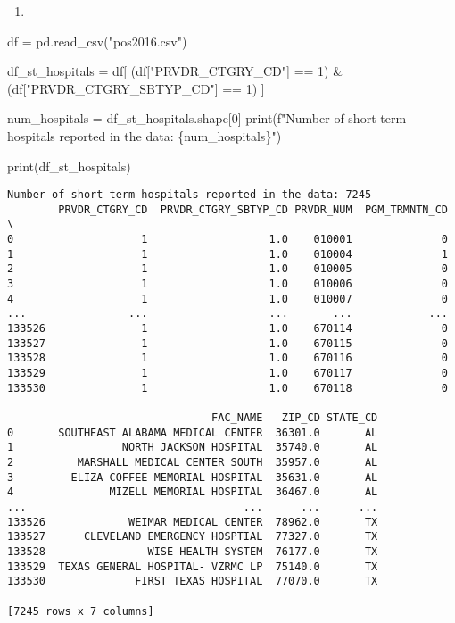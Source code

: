 \documentclass[
  letterpaper,
  DIV=11,
  numbers=noendperiod]{scrartcl}
\newenvironment{Shaded}{\begin{snugshade}}{\end{snugshade}}
\newcommand{\BuiltInTok}[1]{\textcolor[rgb]{0.00,0.23,0.31}{#1}}
\newcommand{\DecValTok}[1]{\textcolor[rgb]{0.68,0.00,0.00}{#1}}
\newcommand{\NormalTok}[1]{\textcolor[rgb]{0.00,0.23,0.31}{#1}}
\newcommand{\OperatorTok}[1]{\textcolor[rgb]{0.37,0.37,0.37}{#1}}
\newcommand{\SpecialCharTok}[1]{\textcolor[rgb]{0.37,0.37,0.37}{#1}}
\newcommand{\SpecialStringTok}[1]{\textcolor[rgb]{0.13,0.47,0.30}{#1}}
\newcommand{\StringTok}[1]{\textcolor[rgb]{0.13,0.47,0.30}{#1}}
\providecommand{\tightlist}{%
  \setlength{\itemsep}{0pt}\setlength{\parskip}{0pt}}\usepackage{longtable,booktabs,array}
\begin{document}
\begin{enumerate}
\def\labelenumi{\arabic{enumi}.}
\setcounter{enumi}{1}
\tightlist
\item
\end{enumerate}

\begin{Shaded}
\begin{Highlighting}[]
\NormalTok{df }\OperatorTok{=}\NormalTok{ pd.read\_csv(}\StringTok{"pos2016.csv"}\NormalTok{)}


\NormalTok{df\_st\_hospitals }\OperatorTok{=}\NormalTok{ df[}
\NormalTok{    (df[}\StringTok{"PRVDR\_CTGRY\_CD"}\NormalTok{] }\OperatorTok{==} \DecValTok{1}\NormalTok{) }\OperatorTok{\&} 
\NormalTok{    (df[}\StringTok{"PRVDR\_CTGRY\_SBTYP\_CD"}\NormalTok{] }\OperatorTok{==} \DecValTok{1}\NormalTok{)}
\NormalTok{]}

\NormalTok{num\_hospitals }\OperatorTok{=}\NormalTok{ df\_st\_hospitals.shape[}\DecValTok{0}\NormalTok{]}
\BuiltInTok{print}\NormalTok{(}\SpecialStringTok{f"Number of short{-}term hospitals reported in the data: }\SpecialCharTok{\{}\NormalTok{num\_hospitals}\SpecialCharTok{\}}\SpecialStringTok{"}\NormalTok{)}

\BuiltInTok{print}\NormalTok{(df\_st\_hospitals)}
\end{Highlighting}
\end{Shaded}

\begin{verbatim}
Number of short-term hospitals reported in the data: 7245
        PRVDR_CTGRY_CD  PRVDR_CTGRY_SBTYP_CD PRVDR_NUM  PGM_TRMNTN_CD  \
0                    1                   1.0    010001              0   
1                    1                   1.0    010004              1   
2                    1                   1.0    010005              0   
3                    1                   1.0    010006              0   
4                    1                   1.0    010007              0   
...                ...                   ...       ...            ...   
133526               1                   1.0    670114              0   
133527               1                   1.0    670115              0   
133528               1                   1.0    670116              0   
133529               1                   1.0    670117              0   
133530               1                   1.0    670118              0   

                                FAC_NAME   ZIP_CD STATE_CD  
0       SOUTHEAST ALABAMA MEDICAL CENTER  36301.0       AL  
1                 NORTH JACKSON HOSPITAL  35740.0       AL  
2          MARSHALL MEDICAL CENTER SOUTH  35957.0       AL  
3         ELIZA COFFEE MEMORIAL HOSPITAL  35631.0       AL  
4               MIZELL MEMORIAL HOSPITAL  36467.0       AL  
...                                  ...      ...      ...  
133526             WEIMAR MEDICAL CENTER  78962.0       TX  
133527      CLEVELAND EMERGENCY HOSPTIAL  77327.0       TX  
133528                WISE HEALTH SYSTEM  76177.0       TX  
133529  TEXAS GENERAL HOSPITAL- VZRMC LP  75140.0       TX  
133530              FIRST TEXAS HOSPITAL  77070.0       TX  

[7245 rows x 7 columns]
\end{verbatim}
\end{document}

